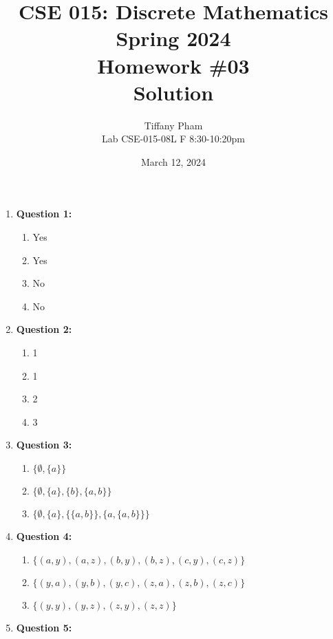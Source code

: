 \documentclass[11pt]{article}
\begin{document}
\author{Tiffany Pham\\
Lab CSE-015-08L F 8:30-10:20pm}
\title{CSE 015: Discrete Mathematics\\
Spring 2024\\
Homework \#03\\
Solution}
\date{March 12, 2024}
\maketitle
\begin{enumerate}
    \item \textbf{Question 1:}
    \begin{enumerate}[label=(\alph*)]
        \item Yes
        \item Yes
        \item No
        \item No
    \end{enumerate}
    \item \textbf{Question 2:}
    \begin{enumerate}[label=(\alph*)]
        \item 1
        \item 1
        \item 2
        \item 3
    \end{enumerate}
    \item \textbf{Question 3:}
    \begin{enumerate}[label=(\alph*)]
        \item $\{\emptyset,\{a\}\}$
        \item $\{\emptyset, \{a\}, \{b\}, \{a,b\}\}$
        \item $\{\emptyset,\{a\},\{\{a,b\}\},\{a,\{a,b\}\}\}$
    \end{enumerate}
    \item \textbf{Question 4:}
    \begin{enumerate}[label=(\alph*)]
        \item $\{(a,y),(a,z),(b,y),(b,z),(c,y),(c,z)\}$
        \item $\{(y,a),(y,b),(y,c),(z,a),(z,b),(z,c)\}$
        \item $\{(y, y), (y, z), (z, y), (z, z)\}$
    \end{enumerate}
    \item \textbf{Question 5:}

\end{enumerate}
\end{document}
